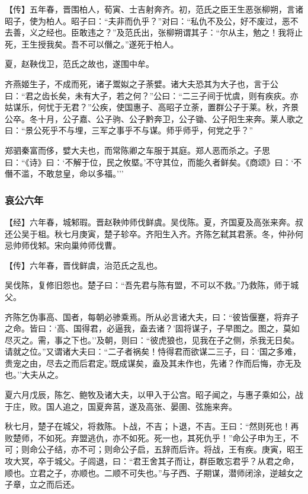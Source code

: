\documentclass[]{article}
\begin{document}
【传】五年春，晋围柏人，荀寅、士吉射奔齐。初，范氏之臣王生恶张柳朔，言诸昭子，使为柏人。昭子曰：``夫非而仇乎？''对曰：``私仇不及公，好不废过，恶不去善，义之经也。臣敢违之？''及范氏出，张柳朔谓其子：``尔从主，勉之！我将止死，王生授我矣。吾不可以僭之。''遂死于柏人。

夏，赵鞅伐卫，范氏之故也，遂围中牟。

齐燕姬生子，不成而死，诸子鬻姒之子荼嬖。诸大夫恐其为大子也，言于公曰：``君之齿长矣，未有大子，若之何？''公曰：``二三子间于忧虞，则有疾疢。亦姑谋乐，何忧于无君？''公疾，使国惠子、高昭子立荼，置群公子于莱。秋，齐景公卒。冬十月，公子嘉、公子驹、公子黔奔卫，公子锄、公子阳生来奔。莱人歌之曰：``景公死乎不与埋，三军之事乎不与谋。师乎师乎，何党之乎？''

郑驷秦富而侈，嬖大夫也，而常陈卿之车服于其庭。郑人恶而杀之。子思曰：``《诗》曰：`不解于位，民之攸塈。'不守其位，而能久者鲜矣。《商颂》曰：`不僭不滥，不敢怠皇，命以多福。'''

\hypertarget{header-n3094}{%
\subsubsection{哀公六年}\label{header-n3094}}

【经】六年春，城邾瑕。晋赵鞅帅师伐鲜虞。吴伐陈。夏，齐国夏及高张来奔。叔还公吴于柤。秋七月庚寅，楚子轸卒。齐阳生入齐。齐陈乞弑其君荼。冬，仲孙何忌帅师伐邾。宋向巢帅师伐曹。

【传】六年春，晋伐鲜虞，治范氏之乱也。

吴伐陈，复修旧怨也。楚子曰：``吾先君与陈有盟，不可以不救。''乃救陈，师于城父。

齐陈乞伪事高、国者，每朝必骖乘焉。所从必言诸大夫，曰：``彼皆偃蹇，将弃子之命。皆曰：`高、国得君，必逼我，盍去诸？'固将谋子，子早图之。图之，莫如尽灭之。需，事之下也。''及朝，则曰：``彼虎狼也，见我在子之侧，杀我无日矣。请就之位。''又谓诸大夫曰：``二子者祸矣！恃得君而欲谋二三子，曰：`国之多难，贵宠之由，尽去之而后君定。'既成谋矣，盍及其未作也，先诸？作而后悔，亦无及也。''大夫从之。

夏六月戊辰，陈乞、鲍牧及诸大夫，以甲入于公宫。昭子闻之，与惠子乘如公，战于庄，败。国人追之，国夏奔莒，遂及高张、晏圉、弦施来奔。

秋七月，楚子在城父，将救陈。卜战，不吉；卜退，不吉。王曰：``然则死也！再败楚师，不如死。弃盟逃仇，亦不如死。死一也，其死仇乎！''命公子申为王，不可；则命公子结，亦不可；则命公子启，五辞而后许。将战，王有疾。庚寅，昭王攻大冥，卒于城父。子闾退，曰：``君王舍其子而让，群臣敢忘君乎？从君之命，顺也。立君之子，亦顺也。二顺不可失也。''与子西、子期谋，潜师闭涂，逆越女之子章，立之而后还。
\end{document}
